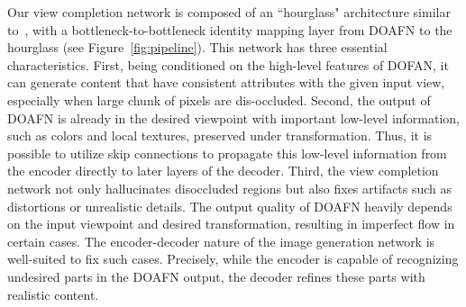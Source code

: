 \documentclass[10pt,twocolumn,letterpaper]{article}
\begin{document}
%
Our view completion network is composed of an ``hourglass" architecture similar to~\cite{newell_eccv2016}, with a bottleneck-to-bottleneck identity mapping layer from DOAFN to the hourglass (see Figure~\ref{fig:pipeline}). This network has three essential characteristics. First, being conditioned on the high-level features of DOFAN, it can generate content that have consistent attributes with the given input view, especially when large chunk of pixels are dis-occluded. Second, the output of DOAFN is already in the desired viewpoint with important low-level information, such as colors and local textures, preserved under transformation. Thus, it is possible to utilize skip connections to propagate this low-level information from the encoder directly to later layers of the decoder. Third, the view completion network not only hallucinates disoccluded regions but also fixes artifacts such as distortions or unrealistic details. The output quality of DOAFN heavily depends on the input viewpoint and desired transformation, resulting in imperfect flow in certain cases. The encoder-decoder nature of the image generation network is well-suited to fix such cases. Precisely, while the encoder is capable of recognizing undesired parts in the DOAFN output, the decoder refines these parts with realistic content.
\end{document}
